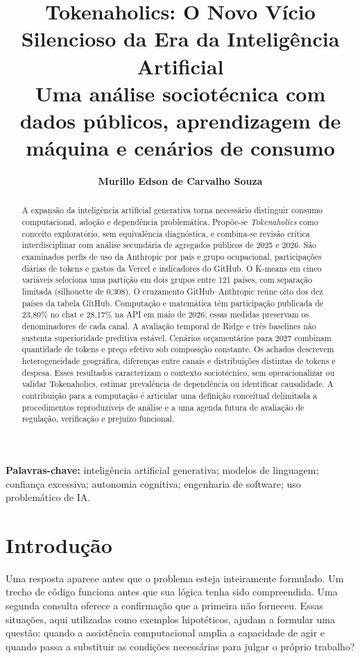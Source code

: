 \documentclass[11pt,a4paper]{article}
\author[1]{\textbf{Murillo Edson de Carvalho Souza}}
\affil[1]{Universidade de Brasília (UnB)\\Departamento de Ciências da Computação}
\date{}
\begin{document}
\title{\textbf{Tokenaholics: O Novo Vício Silencioso da Era da Inteligência Artificial}\\[0.5em]\large Uma análise sociotécnica com dados públicos, aprendizagem de máquina e cenários de consumo}
\maketitle
\begin{abstract}
A expansão da inteligência artificial generativa torna necessário distinguir consumo computacional, adoção e dependência problemática. Propõe-se \textit{Tokenaholics} como conceito exploratório, sem equivalência diagnóstica, e combina-se revisão crítica interdisciplinar com análise secundária de agregados públicos de 2025 e 2026. São examinados perfis de uso da Anthropic por país e grupo ocupacional, participações diárias de tokens e gastos da Vercel e indicadores do GitHub. O K-means em cinco variáveis seleciona uma partição em dois grupos entre 121 países, com separação limitada (silhouette de 0,308). O cruzamento GitHub--Anthropic reúne oito dos dez países da tabela GitHub. Computação e matemática têm participação publicada de 23,80\% no chat e 28,17\% na API em maio de 2026; essas medidas preservam os denominadores de cada canal. A avaliação temporal de Ridge e três baselines não sustenta superioridade preditiva estável. Cenários orçamentários para 2027 combinam quantidade de tokens e preço efetivo sob composição constante. Os achados descrevem heterogeneidade geográfica, diferenças entre canais e distribuições distintas de tokens e despesa. Esses resultados caracterizam o contexto sociotécnico, sem operacionalizar ou validar Tokenaholics, estimar prevalência de dependência ou identificar causalidade. A contribuição para a computação é articular uma definição conceitual delimitada a procedimentos reproduzíveis de análise e a uma agenda futura de avaliação de regulação, verificação e prejuízo funcional.
\end{abstract}
\noindent\textbf{Palavras-chave:} inteligência artificial generativa; modelos de linguagem; confiança excessiva; autonomia cognitiva; engenharia de software; uso problemático de IA.

\section{Introdução}
Uma resposta aparece antes que o problema esteja inteiramente formulado. Um trecho de código funciona antes que sua lógica tenha sido compreendida. Uma segunda consulta oferece a confirmação que a primeira não forneceu. Essas situações, aqui utilizadas como exemplos hipotéticos, ajudam a formular uma questão: quando a assistência computacional amplia a capacidade de agir e quando passa a substituir as condições necessárias para julgar o próprio trabalho?
\end{document}
